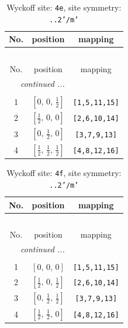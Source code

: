 \documentclass[fleqn,8pt]{jsarticle}
\begin{document}
\renewcommand{\arraystretch}{1.2}
\begin{longtable}{ccc}
\caption{Wyckoff site: {\tt 4e}, site symmetry: {\tt ..2'/m'}}
 \\
 \hline \hline
No. & position & mapping \\ \hline \endfirsthead

\multicolumn{2}{l}{\tablename\ \thetable{}} \\
 \hline \hline
No. & position & mapping \\ \hline \endhead

 \hline \hline
\multicolumn{2}{r}{\footnotesize\it continued ...} \\ \endfoot

 \hline \hline
\multicolumn{2}{r}{} \\ \endlastfoot

1 & $\left[ 0,\, 0,\, \frac{1}{2} \right]$ & {\tt [1,5,11,15]} \\ \hline
2 & $\left[ \frac{1}{2},\, 0,\, 0 \right]$ & {\tt [2,6,10,14]} \\ \hline
3 & $\left[ 0,\, \frac{1}{2},\, 0 \right]$ & {\tt [3,7,9,13]} \\ \hline
4 & $\left[ \frac{1}{2},\, \frac{1}{2},\, \frac{1}{2} \right]$ & {\tt [4,8,12,16]} \\
\end{longtable}
\renewcommand{\arraystretch}{1.2}
\begin{longtable}{ccc}
\caption{Wyckoff site: {\tt 4f}, site symmetry: {\tt ..2'/m'}}
 \\
 \hline \hline
No. & position & mapping \\ \hline \endfirsthead

\multicolumn{2}{l}{\tablename\ \thetable{}} \\
 \hline \hline
No. & position & mapping \\ \hline \endhead

 \hline \hline
\multicolumn{2}{r}{\footnotesize\it continued ...} \\ \endfoot

 \hline \hline
\multicolumn{2}{r}{} \\ \endlastfoot

1 & $\left[ 0,\, 0,\, 0 \right]$ & {\tt [1,5,11,15]} \\ \hline
2 & $\left[ \frac{1}{2},\, 0,\, \frac{1}{2} \right]$ & {\tt [2,6,10,14]} \\ \hline
3 & $\left[ 0,\, \frac{1}{2},\, \frac{1}{2} \right]$ & {\tt [3,7,9,13]} \\ \hline
4 & $\left[ \frac{1}{2},\, \frac{1}{2},\, 0 \right]$ & {\tt [4,8,12,16]} \\
\end{longtable}
\end{document}
